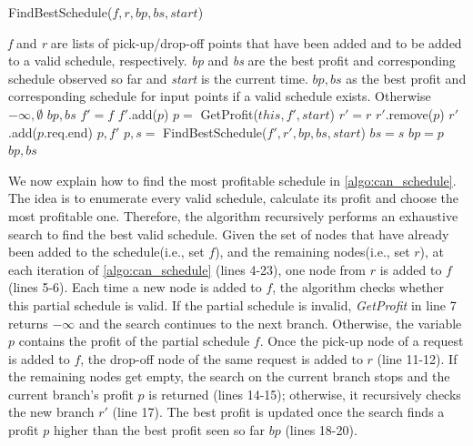 \begin{algorithm}[!ht]
	\caption{FindBestSchedule($f, r, bp, bs, start$)}
	\label{algo:can_schedule}
	\begin{algorithmic}[1]
		\REQUIRE \emph{f} and \emph{r} are lists of pick-up/drop-off points that have been added and to be added to a valid schedule, respectively. \emph{bp} and \emph{bs} are the best profit and corresponding schedule observed so far and \emph{start} is the current time.
		\ENSURE $bp, bs$ as the best profit and corresponding schedule for input points if a valid schedule exists. Otherwise $-\infty, \emptyset$
		\RETURN $bp, bs$
		\ENDIF
		\STATE $f' = f$
		\STATE $f'$.add($p$)
		\STATE $p =$ GetProfit($this, f', start$)
		\STATE $r' = r$
		\STATE $r'$.remove($p$)
		\STATE $r'$.add($p$.req.end)\label{ln:dropoff}
		\ENDIF
		\RETURN $p, f'$
		\ENDIF
		\STATE $p, s =$ FindBestSchedule($f', r', bp, bs, start$)
		\STATE $bs = s$
		\STATE $bp = p$
		\ENDIF
		\ENDIF
		\ENDFOR
		\RETURN $bp, bs$
	\end{algorithmic} \vspace{-1mm}
\end{algorithm}

We now explain how to find the most profitable schedule in \cref{algo:can_schedule}. The idea is to enumerate every valid schedule, calculate its profit and choose the most profitable one. Therefore, the algorithm recursively performs an exhaustive search to find the best valid schedule. Given the set of nodes that have already been added to the schedule(i.e., set $f$), and the remaining nodes(i.e., set $r$), at each iteration of \cref{algo:can_schedule} (lines 4-23), one node from $r$ is added to $f$ (lines 5-6). Each time a new node is added to $f$, the algorithm checks whether this partial schedule is valid. If the partial schedule is invalid, \textit{GetProfit} in line 7 returns $-\infty$ and the search continues to the next branch. Otherwise, the variable $p$ contains the profit of the partial schedule $f$. Once the pick-up node of a request is added to $f$, the drop-off node of the same request is added to $r$ (line 11-12). If the remaining nodes get empty, the search on the current branch stops and the current branch's profit $p$ is returned (lines 14-15); otherwise, it recursively checks the new branch $r'$ (line 17). The best profit is updated once the search finds a profit $p$ higher than the best profit seen so far $bp$ (lines 18-20). 

